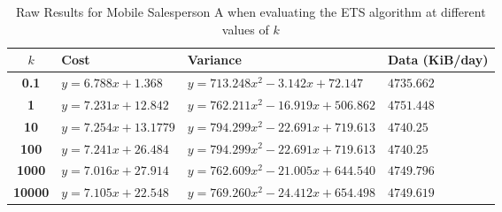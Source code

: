 \begin{table}[htdp]
\begin{center}
\begin{tabular}{|c|l|l|l|}
\hline
\tiny\textbf{$k$} &  \tiny\textbf{Cost} & \tiny\textbf{Variance} & \tiny\textbf{Data (KiB/day)} \\
\hline
\tiny\textbf{0.1} & \tiny$y=6.788x+1.368$ & \tiny$y=713.248x^2-3.142x+72.147$ & \tiny$4735.662$ \\
\hline
\tiny\textbf{1} & \tiny$y=7.231x+12.842$ & \tiny$y=762.211x^2-16.919x+506.862$ & \tiny$4751.448$ \\
\hline
\tiny\textbf{10} & \tiny$y=7.254x+13.1779$ & \tiny$y=794.299x^2-22.691x+719.613$ & \tiny$4740.25 $ \\
\hline
\tiny\textbf{100} & \tiny$y=7.241x+26.484$ & \tiny$y=794.299x^2-22.691x+719.613$ & \tiny$4740.25 $ \\
\hline
\tiny\textbf{1000} & \tiny$y=7.016x+27.914$ & \tiny$y=762.609x^2-21.005x+644.540$ & \tiny$4749.796$ \\
\hline
\tiny\textbf{10000} & \tiny$y=7.105x+22.548$ & \tiny$y=769.260x^2-24.412x+654.498$ & \tiny$4749.619$ \\
\hline
\end{tabular}
\end{center}
\caption{Raw Results for Mobile Salesperson A when evaluating the ETS algorithm at different values of $k$}
\label{sales_a:ets-k_rawresults}
\end{table}
